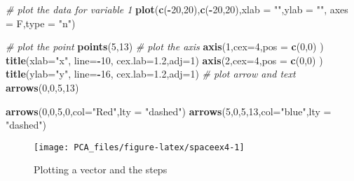 \documentclass[
]{book}
\newenvironment{Shaded}{\begin{snugshade}}{\end{snugshade}}
\newcommand{\CommentTok}[1]{\textcolor[rgb]{0.56,0.35,0.01}{\textit{#1}}}
\newcommand{\DataTypeTok}[1]{\textcolor[rgb]{0.13,0.29,0.53}{#1}}
\newcommand{\DecValTok}[1]{\textcolor[rgb]{0.00,0.00,0.81}{#1}}
\newcommand{\FloatTok}[1]{\textcolor[rgb]{0.00,0.00,0.81}{#1}}
\newcommand{\KeywordTok}[1]{\textcolor[rgb]{0.13,0.29,0.53}{\textbf{#1}}}
\newcommand{\NormalTok}[1]{#1}
\newcommand{\OperatorTok}[1]{\textcolor[rgb]{0.81,0.36,0.00}{\textbf{#1}}}
\newcommand{\StringTok}[1]{\textcolor[rgb]{0.31,0.60,0.02}{#1}}
\theoremstyle{definition}
\theoremstyle{definition}
\theoremstyle{definition}
\theoremstyle{remark}
\begin{document}
\begin{Shaded}
\begin{Highlighting}[]
\CommentTok{# plot the data for variable 1}
\KeywordTok{plot}\NormalTok{(}\KeywordTok{c}\NormalTok{(}\OperatorTok{-}\DecValTok{20}\NormalTok{,}\DecValTok{20}\NormalTok{),}\KeywordTok{c}\NormalTok{(}\OperatorTok{-}\DecValTok{20}\NormalTok{,}\DecValTok{20}\NormalTok{),}\DataTypeTok{xlab =} \StringTok{""}\NormalTok{,}\DataTypeTok{ylab =} \StringTok{""}\NormalTok{,}
 \DataTypeTok{axes =}\NormalTok{ F,}\DataTypeTok{type =} \StringTok{"n"}\NormalTok{)}

\CommentTok{# plot the point}
\KeywordTok{points}\NormalTok{(}\DecValTok{5}\NormalTok{,}\DecValTok{13}\NormalTok{)}
\CommentTok{# plot the axis}
\KeywordTok{axis}\NormalTok{(}\DecValTok{1}\NormalTok{,}\DataTypeTok{cex=}\DecValTok{4}\NormalTok{,}\DataTypeTok{pos =} \KeywordTok{c}\NormalTok{(}\DecValTok{0}\NormalTok{,}\DecValTok{0}\NormalTok{) )}
\KeywordTok{title}\NormalTok{(}\DataTypeTok{xlab=}\StringTok{"x"}\NormalTok{, }\DataTypeTok{line=}\OperatorTok{-}\DecValTok{10}\NormalTok{, }\DataTypeTok{cex.lab=}\FloatTok{1.2}\NormalTok{,}\DataTypeTok{adj=}\DecValTok{1}\NormalTok{)}
\KeywordTok{axis}\NormalTok{(}\DecValTok{2}\NormalTok{,}\DataTypeTok{cex=}\DecValTok{4}\NormalTok{,}\DataTypeTok{pos =} \KeywordTok{c}\NormalTok{(}\DecValTok{0}\NormalTok{,}\DecValTok{0}\NormalTok{) )}
\KeywordTok{title}\NormalTok{(}\DataTypeTok{ylab=}\StringTok{"y"}\NormalTok{, }\DataTypeTok{line=}\OperatorTok{-}\DecValTok{16}\NormalTok{, }\DataTypeTok{cex.lab=}\FloatTok{1.2}\NormalTok{,}\DataTypeTok{adj=}\DecValTok{1}\NormalTok{)}
\CommentTok{# plot arrow and text}
\KeywordTok{arrows}\NormalTok{(}\DecValTok{0}\NormalTok{,}\DecValTok{0}\NormalTok{,}\DecValTok{5}\NormalTok{,}\DecValTok{13}\NormalTok{)}

\KeywordTok{arrows}\NormalTok{(}\DecValTok{0}\NormalTok{,}\DecValTok{0}\NormalTok{,}\DecValTok{5}\NormalTok{,}\DecValTok{0}\NormalTok{,}\DataTypeTok{col=}\StringTok{"Red"}\NormalTok{,}\DataTypeTok{lty =} \StringTok{"dashed"}\NormalTok{)}
\KeywordTok{arrows}\NormalTok{(}\DecValTok{5}\NormalTok{,}\DecValTok{0}\NormalTok{,}\DecValTok{5}\NormalTok{,}\DecValTok{13}\NormalTok{,}\DataTypeTok{col=}\StringTok{"blue"}\NormalTok{,}\DataTypeTok{lty =} \StringTok{"dashed"}\NormalTok{)}
\end{Highlighting}
\end{Shaded}

\begin{figure}

{\centering \texttt{[image: PCA\_files/figure-latex/spaceex4-1]} 

}

\caption{Plotting a vector and the steps}\label{fig:spaceex4}
\end{figure}
\end{document}
